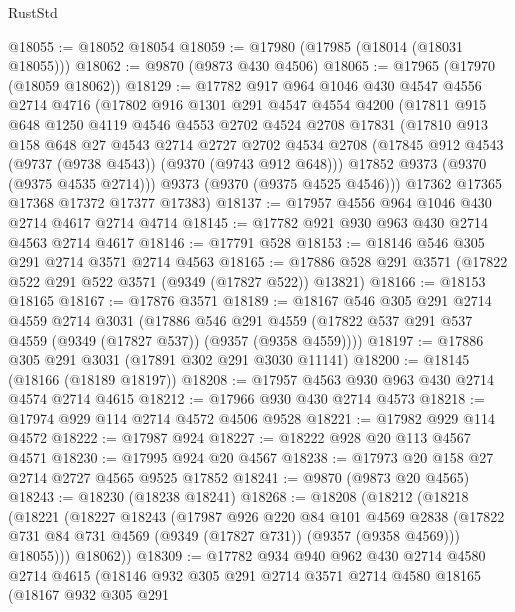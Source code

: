 \begin{lexlean}{RustStd}
\begin{coremodule}
@18055 := @18052 @18054
@18059 := @17980 (@17985 (@18014 (@18031 @18055)))
@18062 := @9870 (@9873 @430 @4506)
@18065 := @17965 (@17970 (@18059 @18062))
@18129 := @17782
    @917
    @964
    @1046
    @430
    @4547
    @4556
    @2714
    @4716
    (@17802
      @916
      @1301
      @291
      @4547
      @4554
      @4200
      (@17811
        @915
        @648
        @1250
        @4119
        @4546
        @4553
        @2702
        @4524
        @2708
        @17831
        (@17810
          @913
          @158
          @648
          @27
          @4543
          @2714
          @2727
          @2702
          @4534
          @2708
          (@17845 @912 @4543 (@9737 (@9738 @4543)) (@9370 (@9743 @912 @648)))
          @17852
          @9373
          (@9370 (@9375 @4535 @2714)))
        @9373
        (@9370 (@9375 @4525 @4546)))
      @17362
      @17365
      @17368
      @17372
      @17377
      @17383)
@18137 := @17957 @4556 @964 @1046 @430 @2714 @4617 @2714 @4714
@18145 := @17782 @921 @930 @963 @430 @2714 @4563 @2714 @4617
@18146 := @17791 @528
@18153 := @18146 @546 @305 @291 @2714 @3571 @2714 @4563
@18165 := @17886 @528 @291 @3571 (@17822 @522 @291 @522 @3571 (@9349 (@17827 @522)) @13821)
@18166 := @18153 @18165
@18167 := @17876 @3571
@18189 := @18167
    @546
    @305
    @291
    @2714
    @4559
    @2714
    @3031
    (@17886
      @546
      @291
      @4559
      (@17822 @537 @291 @537 @4559 (@9349 (@17827 @537)) (@9357 (@9358 @4559))))
@18197 := @17886 @305 @291 @3031 (@17891 @302 @291 @3030 @11141)
@18200 := @18145 (@18166 (@18189 @18197))
@18208 := @17957 @4563 @930 @963 @430 @2714 @4574 @2714 @4615
@18212 := @17966 @930 @430 @2714 @4573
@18218 := @17974 @929 @114 @2714 @4572 @4506 @9528
@18221 := @17982 @929 @114 @4572
@18222 := @17987 @924
@18227 := @18222 @928 @20 @113 @4567 @4571
@18230 := @17995 @924 @20 @4567
@18238 := @17973 @20 @158 @27 @2714 @2727 @4565 @9525 @17852
@18241 := @9870 (@9873 @20 @4565)
@18243 := @18230 (@18238 @18241)
@18268 := @18208
    (@18212
      (@18218
        (@18221
          (@18227
            @18243
            (@17987
              @926
              @220
              @84
              @101
              @4569
              @2838
              (@17822 @731 @84 @731 @4569 (@9349 (@17827 @731)) (@9357 (@9358 @4569)))
              @18055)))
        @18062))
@18309 := @17782
    @934
    @940
    @962
    @430
    @2714
    @4580
    @2714
    @4615
    (@18146
      @932
      @305
      @291
      @2714
      @3571
      @2714
      @4580
      @18165
      (@18167
        @932
        @305
        @291

\end{coremodule}
\end{lexlean}
